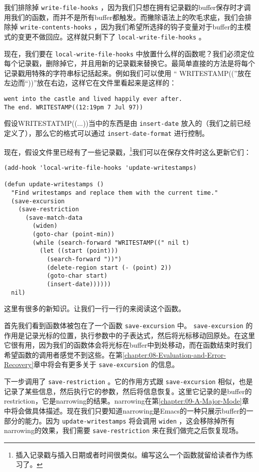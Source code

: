 我们排除掉 \texttt{write-file-hooks} ，因为我们只想在拥有记录戳的buffer保存时才调用我们的函数，而并不是所有buffer都触发。而撇除语法上的吹毛求疵，我们会排除掉 \texttt{write-contents-hooks} ，因为我们希望所选择的钩子变量对于buffer的主模式的变更不做回应。这样就只剩下了 \texttt{local-write-file-hooks} 。

现在，我们要在 \texttt{local-write-file-hooks} 中放置什么样的函数呢？我们必须定位每个记录戳，删除掉它，并且用新的记录戳来替换它。最简单直接的方法是将每个记录戳用特殊的字符串标记括起来。例如我们可以使用 “ WRITESTAMP((”放在左边而“))”放在右边，这样它在文件里看起来是这样的：

\begin{verbatim}
went into the castle and lived happily ever after.
The end. WRITESTAMP((12:19pm 7 Jul 97))
\end{verbatim}

假设WRITESTATMP((...))当中的东西是由 \texttt{insert-date} 放入的（我们之前已经定义了），那么它的格式可以通过 \texttt{insert-date-format} 进行控制。

现在，假设文件里已经有了一些记录戳，\footnote{插入记录戳与插入日期或者时间很类似。编写这么一个函数就留给读者作为练习了。}我们可以在保存文件时这么更新它们：

\begin{verbatim}
(add-hook 'local-write-file-hooks 'update-writestamps)

(defun update-writestamps ()
  "Find writestamps and replace them with the current time."
  (save-excursion
    (save-restriction
      (save-match-data
        (widen)
        (goto-char (point-min))
        (while (search-forward "WRITESTAMP((" nil t)
          (let ((start (point)))
            (search-forward "))")
            (delete-region start (- (point) 2))
            (goto-char start)
            (insert-date))))))
  nil)
\end{verbatim}

这里有很多的新知识。让我们一行一行的来阅读这个函数。

首先我们看到函数体被包在了一个函数 \texttt{save-excursion} 中。 \texttt{save-excursion} 的作用是记录光标的位置，执行参数中的子表达式，然后将光标移动回原处。在这里它很有用，因为我们的函数体会将光标在buffer中到处移动，而在函数结束时我们希望函数的调用者感觉不到这些。在第\ref{chapter:08-Evaluation-and-Error-Recovery}章中将会有更多关于 \texttt{save-excursion} 的信息。

下一步调用了 \texttt{save-restriction} 。它的作用方式跟 \texttt{save-excursion} 相似，也是记录了某些信息，然后执行它的参数，然后将信息恢复。这里它记录的是buffer的restriction，它是narrowing的结果。narrowing在第\ref{chapter:09-A-Major-Mode}章中将会做具体描述。现在我们只要知道narrowing是Emacs的一种只展示buffer的一部分的能力。因为 \texttt{update-writestamps} 将会调用 \texttt{widen} ，这会移除掉所有narrowing的效果，我们需要 \texttt{save-restriction} 来在我们做完之后恢复现场。

